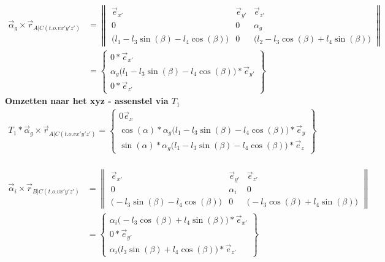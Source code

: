 \documentclass[a4paper,10pt]{article}
\begin{document}
\begin{equation}
	\begin{aligned}
		\vec{\alpha}_g \times \vec{r}_{A|C(t.o.v x'y'z')}  &=  \begin{Vmatrix}
			\vec{e}_{x'}& \vec{e}_{y'} & \vec{e}_{z'}\\
			0 & 0 & \alpha_g \\		
			\Big(l_1 - l_3 \sin(\beta) - l_4 \cos(\beta)\Big) &
			0 & \Big (l_2 - l_3 \cos(\beta) + l_4 \sin(\beta) \Big) 
		\end{Vmatrix}\\
		&= \begin{Bmatrix}
			0*\vec{e}_{x'}\\
			\alpha_g \Big(l_1 - l_3 \sin(\beta) - l_4 \cos(\beta)\Big)*\vec{e}_{y'}\\
			0*\vec{e}_{z'}
		\end{Bmatrix}
	\end{aligned}
\end{equation}
\textbf{Omzetten naar het xyz - assenstel via $T_1$}
\begin{equation}
	\begin{aligned}
		{T}_{1}*\vec{\alpha}_g \times \vec{r}_{A|C(t.o.v x'y'z')} = \begin{Bmatrix}
		{0\vec{e}_{x}}\\
		\cos(\alpha)*	\alpha_g \Big(l_1 - l_3 \sin(\beta) - l_4 \cos(\beta)\Big)*\vec{e}_{y}\\
		\sin(\alpha)*	\alpha_g \Big(l_1 - l_3 \sin(\beta) - l_4 \cos(\beta)\Big)*\vec{e}_{z}
		\end{Bmatrix}
	\end{aligned}
\end{equation}\\
\begin{equation}
\begin{aligned}
\vec{\alpha}_i \times \vec{r}_{B|C(t.o.v x'y'z')}  &=  \begin{Vmatrix}
\vec{e}_{x'}& \vec{e}_{y'} & \vec{e}_{z'}\\
0 & \alpha_i & 0 \\		
\Big(- l_3 \sin(\beta) - l_4 \cos(\beta)\Big) &
0 & \Big (- l_3 \cos(\beta) + l_4 \sin(\beta) \Big) 
\end{Vmatrix}\\
&= \begin{Bmatrix}
\alpha_i \Big(- l_3 \cos(\beta) + l_4 \sin(\beta)\Big)*\vec{e}_{x'}\\
0*\vec{e}_{y'}\\
\alpha_i \Big(l_3 \sin(\beta) + l_4 \cos(\beta)\Big)*\vec{e}_{z'}
\end{Bmatrix}
\end{aligned}
\end{equation}
\end{document}
